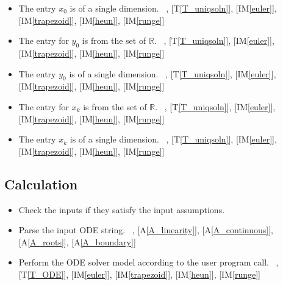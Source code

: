 \documentclass[12pt]{article}
\newcommand{\tref}[1]{T\ref{#1}}
\newcounter{assumpnum} %
\newcommand{\aref}[1]{A\ref{#1}}
\newcommand{\iref}[1]{IM\ref{#1}}
\newcounter{lcnum} %
\newcounter{calcnum} %
\begin{document}
\begin{itemize}
\item[A\refstepcounter{assumpnum}\theassumpnum \label{A_dimofx0}:]
The entry $x_0$ is of a single dimension.
~\newline
[\tref{T_ODE}], [\tref{T_uniqsoln}],
[\iref{euler}], [\iref{trapezoid}], [\iref{heun}], [\iref{runge}]

\item[A\refstepcounter{assumpnum}\theassumpnum \label{A_entriesofy0}:]
The entry for $y_0$ is from the set of $\mathbb{R}$.
~\newline
[\tref{T_ODE}], [\tref{T_uniqsoln}],
[\iref{euler}], [\iref{trapezoid}], [\iref{heun}], [\iref{runge}]

\item[A\refstepcounter{assumpnum}\theassumpnum \label{A_dimofy0}:]
The entry $y_0$ is of a single dimension.
~\newline
[\tref{T_ODE}], [\tref{T_uniqsoln}],
[\iref{euler}], [\iref{trapezoid}], [\iref{heun}], [\iref{runge}]

\item[A\refstepcounter{assumpnum}\theassumpnum \label{A_entriesofxk}:]
The entry for $x_k$ is from the set of $\mathbb{R}$.
~\newline
[\tref{T_ODE}], [\tref{T_uniqsoln}],
[\iref{euler}], [\iref{trapezoid}], [\iref{heun}], [\iref{runge}]

\item[A\refstepcounter{assumpnum}\theassumpnum \label{A_dimofxk}:]
The entry $x_k$ is of a single dimension.
~\newline
[\tref{T_ODE}], [\tref{T_uniqsoln}],
[\iref{euler}], [\iref{trapezoid}], [\iref{heun}], [\iref{runge}]

\end{itemize}

\subsection{Calculation} \label{sec_Calculation}

\begin{itemize}
\item[C\refstepcounter{calcnum}\thecalcnum \label{C_inputs}:]
Check the inputs if they satisfy the input assumptions.
~


\item[C\refstepcounter{calcnum}\thecalcnum \label{C_odeparse}:]
Parse the input ODE string.
~\newline
[\aref{A_explicit}], [\aref{A_linearity}], [\aref{A_continuous}], [\aref{A_roots}],
[\aref{A_boundary}]

\item[C\refstepcounter{calcnum}\thecalcnum \label{C_progname}:]
Perform the ODE solver model according to the user program call.
~\newline
[\aref{A_typeoff}], [\tref{T_ODE}], [\iref{euler}], [\iref{trapezoid}],
[\iref{heun}], [\iref{runge}]


\end{itemize}
\end{document}
